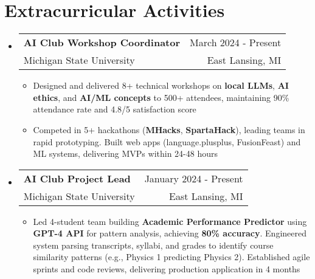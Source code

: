 \documentclass[letterpaper,11pt]{article}
\makeatletter
\newcommand{\resumeItem}[1]{
  \item\small{
    {#1 \vspace{-2pt}}
  }
}
\newcommand{\resumeSubheading}[4]{
  \vspace{-2pt}\item
    \begin{tabular*}{0.97\textwidth}[t]{l@{\extracolsep{\fill}}r}
      \textbf{#1} & \small #2 \\
      \small#3 & \small #4 \\
    \end{tabular*}\vspace{-7pt}
}
\newcommand{\resumeSubHeadingListStart}{\begin{itemize}[leftmargin=0.15in, label={}]}
\newcommand{\resumeSubHeadingListEnd}{\end{itemize}}
\newcommand{\resumeItemListStart}{\begin{itemize}}
\newcommand{\resumeItemListEnd}{\end{itemize}\vspace{-5pt}}
\makeatother
\begin{document}
\section{Extracurricular Activities}
  \resumeSubHeadingListStart
    \resumeSubheading
      {AI Club Workshop Coordinator}{March 2024 - Present}
      {Michigan State University}{East Lansing, MI}
      \resumeItemListStart
        \resumeItem{Designed and delivered 8+ technical workshops on \textbf{local LLMs}, \textbf{AI ethics}, and \textbf{AI/ML concepts} to 500+ attendees, maintaining 90\% attendance rate and 4.8/5 satisfaction score}
        \resumeItem{Competed in 5+ hackathons (\textbf{MHacks}, \textbf{SpartaHack}), leading teams in rapid prototyping. Built web apps (language.plusplus, FusionFeast) and ML systems, delivering MVPs within 24-48 hours}
      \resumeItemListEnd
    
    \resumeSubheading
      {AI Club Project Lead}{January 2024 - Present}
      {Michigan State University}{East Lansing, MI}
      \resumeItemListStart
        \resumeItem{Led 4-student team building \textbf{Academic Performance Predictor} using \textbf{GPT-4 API} for pattern analysis, achieving \textbf{80\% accuracy}. Engineered system parsing transcripts, syllabi, and grades to identify course similarity patterns (e.g., Physics 1 predicting Physics 2). Established agile sprints and code reviews, delivering production application in 4 months}
      \resumeItemListEnd
  \resumeSubHeadingListEnd

\end{document}
